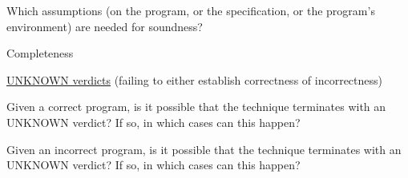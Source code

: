 \documentclass[a4paper]{article}
\begin{document}
\begin{minipage}[t]{0.16\linewidth}
\begin{betterlist}
\begin{betterlist}
\begin{betterlist}
			\end{betterlist}
			\item Which assumptions (on the program, or the specification, or the program’s environment) are needed for soundness?
		\end{betterlist}
		\item \alert{Completeness}
		\begin{betterlist}
			\item \underline{UNKNOWN verdicts} (failing to either establish correctness of incorrectness)
			\begin{betterlist}
				\item Given a correct program, is it possible that the technique terminates with an UNKNOWN verdict? If so, in which cases can this happen?

				\item Given an incorrect program, is it possible that the technique terminates with an UNKNOWN verdict? If so, in which cases can this happen?


\end{betterlist}
\end{betterlist}
\end{betterlist}
\end{minipage}
\end{document}
